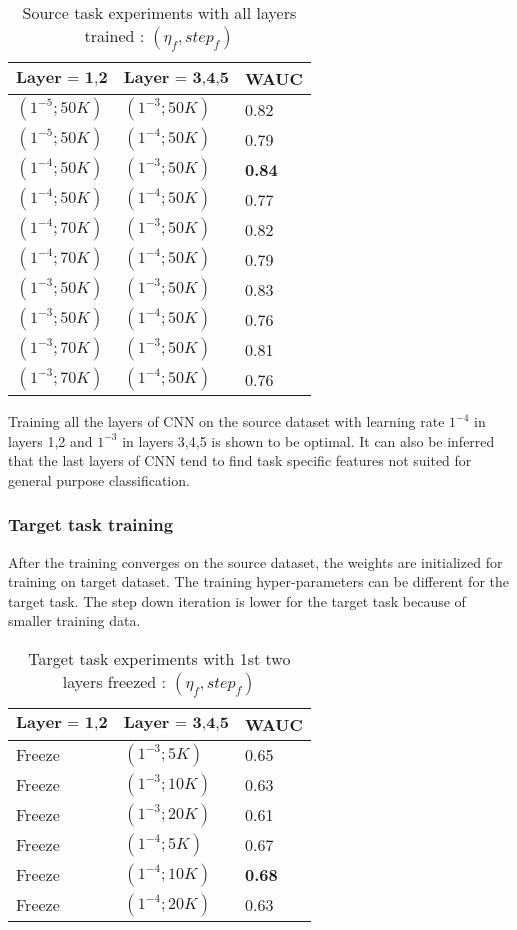 \begin{table}[H]
\label{tab:a6}
\centering
\begin{tabular}{| p{} | p{}| p{}| }
\hline
$\textbf{Layer = 1,2}$ & $\textbf{Layer = 3,4,5}$ & \textbf{WAUC}\\
\hline
$(1^{-5}; 50K)$ & $(1^{-3}; 50K)$ & 0.82\\
\hline
$(1^{-5}; 50K)$ & $(1^{-4}; 50K)$ & 0.79\\
\hline
$(1^{-4}; 50K)$ & $(1^{-3}; 50K)$ & \textbf{0.84}\\
\hline
$(1^{-4}; 50K)$ & $(1^{-4}; 50K)$ & 0.77\\
\hline
$(1^{-4}; 70K)$ & $(1^{-3}; 50K)$ & 0.82\\
\hline
$(1^{-4}; 70K)$ & $(1^{-4}; 50K)$ & 0.79\\
\hline
$(1^{-3}; 50K)$ & $(1^{-3}; 50K)$ & 0.83\\
\hline
$(1^{-3}; 50K)$ & $(1^{-4}; 50K)$ & 0.76\\
\hline
$(1^{-3}; 70K)$ & $(1^{-3}; 50K)$ & 0.81\\
\hline
$(1^{-3}; 70K)$ & $(1^{-4}; 50K)$ & 0.76\\
\hline
\end{tabular}
\caption{Source task experiments with all layers trained : $(\eta_{f}, {step}_{f})$}
\end{table}
\noindent Training all the layers of CNN on the source dataset with learning rate $1^{-4}$ in layers 1,2 and $1^{-3}$ in layers 3,4,5 is shown to be optimal. It can also be inferred that the last layers of CNN tend to find task specific features not suited for general purpose classification. 
 
\subsubsection{Target task training}
After the training converges on the source dataset, the weights are initialized for training on target dataset. The training hyper-parameters can be different for the target task. The step down iteration is lower for the target task because of smaller training data. 
\begin{table}[H]
\label{tab:a7}
\centering
\begin{tabular}{| p{} | p{}| p{}| }
\hline
$\textbf{Layer = 1,2}$ & $\textbf{Layer = 3,4,5}$ & \textbf{WAUC}\\
\hline
Freeze & $(1^{-3}; 5K)$ & 0.65\\
\hline
Freeze & $(1^{-3}; 10K)$ & 0.63\\
\hline
Freeze & $(1^{-3}; 20K)$ & 0.61\\
\hline
Freeze & $(1^{-4}; 5K)$ & 0.67\\
\hline
Freeze & $(1^{-4}; 10K)$ & \textbf{0.68}\\
\hline
Freeze & $(1^{-4}; 20K)$ & 0.63\\
\hline
\end{tabular}
\caption{Target task experiments with 1st two layers freezed : $(\eta_{f}, {step}_{f})$} 
\end{table}


